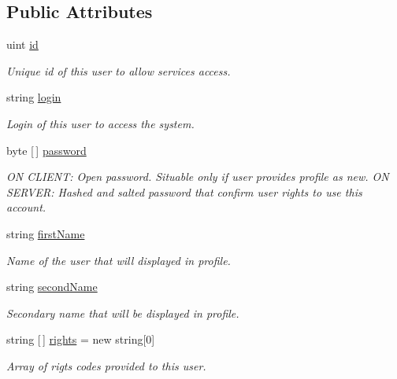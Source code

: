 \subsection*{Public Attributes}
\begin{DoxyCompactItemize}
\item 
uint \mbox{\hyperlink{class_authority_controller_1_1_data_1_1_user_aa637a9c31ebd1d4f4a4fb769ba64b9ca}{id}}
\begin{DoxyCompactList}\small\item\em Unique id of this user to allow services access. \end{DoxyCompactList}\item 
string \mbox{\hyperlink{class_authority_controller_1_1_data_1_1_user_a22a8c2eecc03a53c091786bd65d24c90}{login}}
\begin{DoxyCompactList}\small\item\em Login of this user to access the system. \end{DoxyCompactList}\item 
byte \mbox{[}$\,$\mbox{]} \mbox{\hyperlink{class_authority_controller_1_1_data_1_1_user_a9b3069e679b5a654f9ef7293db65f41f}{password}}
\begin{DoxyCompactList}\small\item\em ON C\+L\+I\+E\+NT\+: Open password. Situable only if user provides profile as new. ON S\+E\+R\+V\+ER\+: Hashed and salted password that confirm user rights to use this account. \end{DoxyCompactList}\item 
string \mbox{\hyperlink{class_authority_controller_1_1_data_1_1_user_a94a2cbd0dc5fdc315f929c3711d0092b}{first\+Name}}
\begin{DoxyCompactList}\small\item\em Name of the user that will displayed in profile. \end{DoxyCompactList}\item 
string \mbox{\hyperlink{class_authority_controller_1_1_data_1_1_user_a7e06ede3b1eb9d24537f530d84129931}{second\+Name}}
\begin{DoxyCompactList}\small\item\em Secondary name that will be displayed in profile. \end{DoxyCompactList}\item 
string \mbox{[}$\,$\mbox{]} \mbox{\hyperlink{class_authority_controller_1_1_data_1_1_user_a750e743023fd2e3b7d22cffd1729c4d3}{rights}} = new string\mbox{[}0\mbox{]}
\begin{DoxyCompactList}\small\item\em Array of rigts\textquotesingle{} codes provided to this user. \end{DoxyCompactList}\item 

\end{DoxyCompactItemize}

